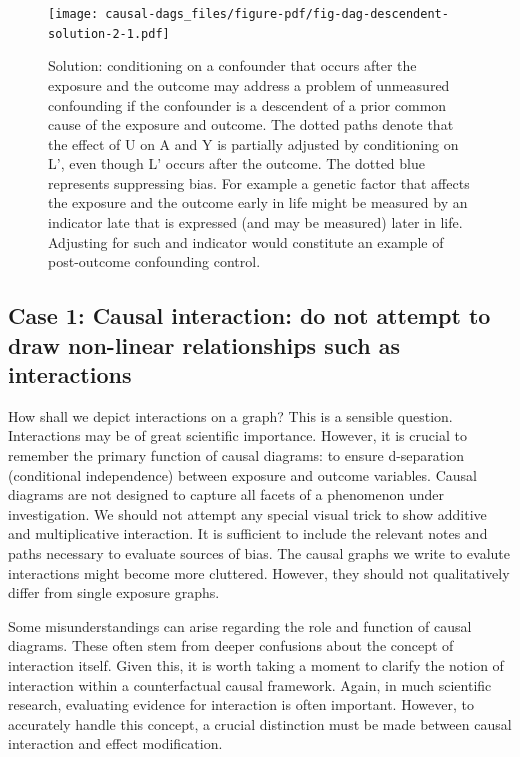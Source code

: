\documentclass[
  singlecolumn]{report}
\begin{document}
\begin{figure}

{\centering \texttt{[image: causal-dags\_files/figure-pdf/fig-dag-descendent-solution-2-1.pdf]}

}

\caption{\label{fig-dag-descendent-solution-2}Solution: conditioning on
a confounder that occurs after the exposure and the outcome may address
a problem of unmeasured confounding if the confounder is a descendent of
a prior common cause of the exposure and outcome. The dotted paths
denote that the effect of U on A and Y is partially adjusted by
conditioning on L', even though L' occurs after the outcome. The dotted
blue represents suppressing bias. For example a genetic factor that
affects the exposure and the outcome early in life might be measured by
an indicator late that is expressed (and may be measured) later in life.
Adjusting for such and indicator would constitute an example of
post-outcome confounding control.}

\end{figure}

\hypertarget{case-1-causal-interaction-do-not-attempt-to-draw-non-linear-relationships-such-as-interactions}{%
\subsection{Case 1: Causal interaction: do not attempt to draw
non-linear relationships such as
interactions}\label{case-1-causal-interaction-do-not-attempt-to-draw-non-linear-relationships-such-as-interactions}}

How shall we depict interactions on a graph? This is a sensible
question. Interactions may be of great scientific importance. However,
it is crucial to remember the primary function of causal diagrams: to
ensure d-separation (conditional independence) between exposure and
outcome variables. Causal diagrams are not designed to capture all
facets of a phenomenon under investigation. We should not attempt any
special visual trick to show additive and multiplicative interaction. It
is sufficient to include the relevant notes and paths necessary to
evaluate sources of bias. The causal graphs we write to evalute
interactions might become more cluttered. However, they should not
qualitatively differ from single exposure graphs.

Some misunderstandings can arise regarding the role and function of
causal diagrams. These often stem from deeper confusions about the
concept of interaction itself. Given this, it is worth taking a moment
to clarify the notion of interaction within a counterfactual causal
framework. Again, in much scientific research, evaluating evidence for
interaction is often important. However, to accurately handle this
concept, a crucial distinction must be made between causal interaction
and effect modification.
\end{document}
